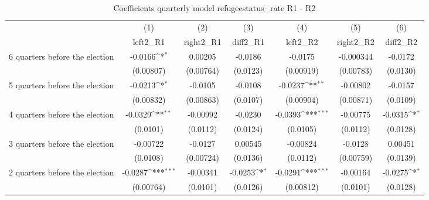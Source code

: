 \begin{table}[htbp]\centering
\def\sym#1{\ifmmode^{#1}\else\(^{#1}\)\fi}
\caption{Coefficients quarterly model refugeestatus\_rate R1 - R2}
\begin{tabular}{l*{6}{c}}
\hline\hline
                    &\multicolumn{1}{c}{(1)}&\multicolumn{1}{c}{(2)}&\multicolumn{1}{c}{(3)}&\multicolumn{1}{c}{(4)}&\multicolumn{1}{c}{(5)}&\multicolumn{1}{c}{(6)}\\
                    &\multicolumn{1}{c}{left2\_R1}&\multicolumn{1}{c}{right2\_R1}&\multicolumn{1}{c}{diff2\_R1}&\multicolumn{1}{c}{left2\_R2}&\multicolumn{1}{c}{right2\_R2}&\multicolumn{1}{c}{diff2\_R2}\\
\hline
 6 quarters before the election&     -0.0166\sym{*}  &     0.00205         &     -0.0186         &     -0.0175         &   -0.000344         &     -0.0172         \\
                    &   (0.00807)         &   (0.00764)         &    (0.0123)         &   (0.00919)         &   (0.00783)         &    (0.0130)         \\
[1em]
 5 quarters before the election&     -0.0213\sym{*}  &     -0.0105         &     -0.0108         &     -0.0237\sym{**} &    -0.00802         &     -0.0157         \\
                    &   (0.00832)         &   (0.00863)         &    (0.0107)         &   (0.00904)         &   (0.00871)         &    (0.0109)         \\
[1em]
 4 quarters before the election&     -0.0329\sym{**} &    -0.00992         &     -0.0230         &     -0.0393\sym{***}&    -0.00775         &     -0.0315\sym{*}  \\
                    &    (0.0101)         &    (0.0112)         &    (0.0124)         &    (0.0105)         &    (0.0112)         &    (0.0128)         \\
[1em]
 3 quarters before the election&    -0.00722         &     -0.0127         &     0.00545         &    -0.00824         &     -0.0128         &     0.00451         \\
                    &    (0.0108)         &   (0.00724)         &    (0.0136)         &    (0.0112)         &   (0.00759)         &    (0.0139)         \\
[1em]
 2 quarters before the election&     -0.0287\sym{***}&    -0.00341         &     -0.0253\sym{*}  &     -0.0291\sym{***}&    -0.00164         &     -0.0275\sym{*}  \\
                    &   (0.00764)         &    (0.0101)         &    (0.0126)         &   (0.00812)         &    (0.0101)         &    (0.0128)         \\

\end{tabular}
\end{table}
